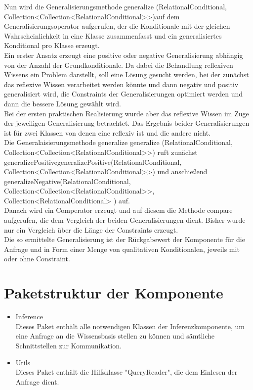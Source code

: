 \documentclass[a4paper, 11pt]{book}
\begin{document}
{Nun wird die Generalisierungsmethode generalize (RelationalConditional, Collection<Collection<RelationalConditional>>)auf dem  Generalisierungsoperator aufgerufen, der die Konditionale mit der gleichen Wahrscheinlichkeit in eine Klasse zusammenfasst und ein generalisiertes Konditional pro Klasse erzeugt.\\
Ein erster Ansatz erzeugt eine positive oder negative Generalisierung abhängig von der Anzahl der Grundkonditionale. Da dabei die Behandlung reflexiven Wissens ein Problem darstellt, soll eine Lösung gesucht werden, bei der zunächst das reflexive Wissen verarbeitet werden könnte und dann negativ und positiv generalisiert wird, die Constraints der Generalisierungen optimiert werden und dann die bessere Lösung gewählt wird. \\
Bei der ersten praktischen Realisierung wurde aber das reflexive Wissen im Zuge der jeweiligen Generalisierung betrachtet. Das Ergebnis beider Generalisierungen ist für zwei Klassen von denen eine reflexiv ist und die andere nicht.\\
Die Generalaisierungsmethode generalize generalize (RelationalConditional, Collection<Collection<RelationalConditional>>) ruft zunächst generalizePositivegeneralizePositive(RelationalConditional,
Collection<Collection<RelationalConditional>>) und anschießend generalizeNegative(RelationalConditional,
Collection<Collection<RelationalConditional>>,
Collection<RelationalConditional> ) auf.\\
Danach wird ein Comperator erzeugt und auf diesem die Methode compare aufgerufen, die dem Vergleich der beiden Generalisierungen dient. Bisher wurde nur ein Vergleich über die Länge der Constraints erzeugt.\\
Die so ermittelte Generalisierung ist der Rückgabewert der Komponente für die Anfrage und in Form einer Menge von qualitativen Konditionalen, jeweils mit oder ohne Constraint.






\section{Paketstruktur der Komponente}
\begin{itemize}
	\item Inference\\
	Dieses Paket enthält alle notwendigen Klassen der Inferenzkomponente, um eine Anfrage an die Wissensbasis stellen zu können und sämtliche Schnittstellen zur Kommunikation. 
	\item Utils\\
	Dieses Paket enthält die Hilfsklasse "{}QueryReader"{}, die dem Einlesen der Anfrage dient.
\end{itemize}

}
\end{document}
